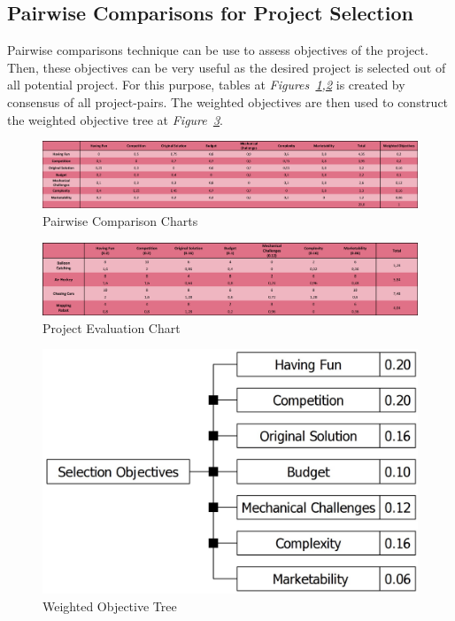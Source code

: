\documentclass[a4paper,12pt]{article}
\begin{document}
	\subsection{Pairwise Comparisons for Project Selection}
		Pairwise comparisons technique can be use to assess objectives of the project. Then, these objectives can be very useful as the desired project is selected out of all potential project. For this purpose, tables at \textit{Figures~\ref{fig:pairwise_comp},\ref{fig:project_eval}} is created by consensus of all project-pairs. The weighted objectives are then used to construct the weighted objective tree at \textit{Figure~\ref{fig:objective_tree}}. 

	\begin{figure}[H]
		\centering
		\includegraphics[width=\textwidth,height=\textheight,keepaspectratio]{images/objective_tree} 
		\caption{\label{fig:pairwise_comp}Pairwise Comparison Charts}
	\end{figure}
	
	\begin{figure}[H]
		\centering
		\includegraphics[width=\textwidth,height=\textheight,keepaspectratio]{images/project_evaluation2} 
		\caption{\label{fig:project_eval}Project Evaluation Chart}
	\end{figure}
	
	
	\begin{figure}[H]
		\centering
		\includegraphics[width=\textwidth,height=\textheight,keepaspectratio]{pre-objective-tree/pre-objective-tree} 
		\caption{\label{fig:objective_tree}Weighted Objective Tree}
	\end{figure}
\end{document}
